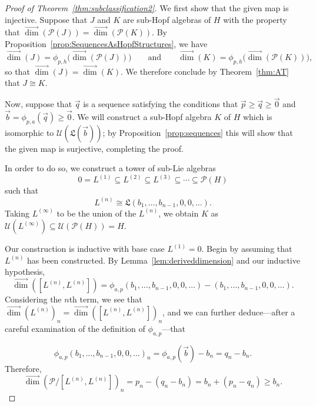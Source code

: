 \documentclass[11pt]{amsart}
\theoremstyle{definition}
\numberwithin{equation}{section}
\newcommand{\vecdim}{\overrightarrow{\dim}}
\begin{document}
\begin{proof}[Proof of Theorem~\ref{thm:subclassification2}]
We first show that the given map is injective.  Suppose that $J$ and $K$ are sub-Hopf algebras of $H$ with the property that $\vecdim(\mathcal{P}(J)) = \vecdim(\mathcal{P}(K))$.  By Proposition~\ref{prop:SequencesAsHopfStructures}, we have
\[
\vecdim(J) = \phi_{p, h}\big(\vecdim(\mathcal{P}(J))\big)
\qquad\text{and}\qquad
\vecdim(K) = \phi_{p, h}\big(\vecdim(\mathcal{P}(K))\big),
\]
so that $\vecdim(J) = \vecdim(K)$.  We therefore conclude by Theorem~\ref{thm:AT} that $J \cong K$.

Now, suppose that $\vec{q}$ is a sequence satisfying the conditions that $\vec{p} \ge \vec{q} \ge \vec{0}$ and $\vec{b} = \phi_{p, a}(\vec{q}) \ge \vec{0}$.  
We will construct a sub-Hopf algebra $K$ of $H$ which is isomorphic to $\mathcal{U}(\mathfrak{L}(\vec{b}))$; by Proposition~\ref{prop:sequences} this will show that the given map is surjective, completing the proof.  

In order to do so, we construct a tower of sub-Lie algebras 
\[
0 = L^{(1)} \subseteq L^{(2)} \subseteq L^{(3)} \subseteq \cdots \subseteq \mathcal{P}(H)
\]
such that 
\[
L^{(n)} \cong \mathfrak{L}(b_{1}, \ldots, b_{n-1}, 0, 0, \ldots).
\]
Taking $L^{(\infty)}$ to be the union of the $L^{(n)}$, we obtain $K$ as $\mathcal{U}(L^{(\infty)}) \subseteq \mathcal{U}(\mathcal{P}(H)) = H$.

Our construction is inductive with base case $L^{(1)} = 0$.  
Begin by assuming that $L^{(n)}$ has been constructed.  
By Lemma~\ref{lem:deriveddimension} and our inductive hypothesis,
\[
\vecdim([L^{(n)}, L^{(n)}])
 = 
\phi_{a, p}(b_{1}, \ldots, b_{n-1}, 0, 0, \ldots) - (b_{1}, \ldots, b_{n-1}, 0, 0, \ldots).
\]
Considering the $n$th term, we see that $\vecdim(L^{(n)})_{n} = \vecdim([L^{(n)}, L^{(n)}])_{n}$, and we can further deduce---after a careful examination of the definition of $\phi_{a, p}$---that

\begin{equation}
\label{eq:inductivedimensionequality}
\phi_{a, p}(b_{1}, \ldots, b_{n-1}, 0, 0, \ldots)_{n}
=
\phi_{a, p}(\vec{b}) - b_{n}
=
q_{n} - b_{n}.
\end{equation}
Therefore,
\[
\vecdim\left( \mathcal{P} \big/ [L^{(n)}, L^{(n)}] \right)_{n}
= p_{n} - (q_{n} - b_{n})
= b_{n} + (p_{n} - q_{n})
\ge b_{n}.
\]


\end{proof}
\end{document}
